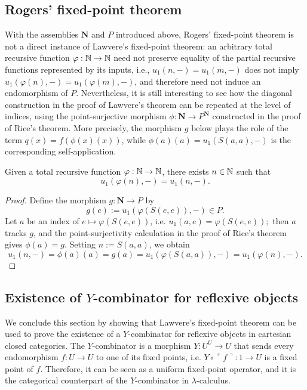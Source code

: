 \subsection*{Rogers' fixed-point theorem}
With the assemblies $\mathbf N$ and $P$ introduced above, Rogers' fixed-point theorem is not a direct instance of Lawvere's fixed-point theorem:
an arbitrary total recursive function $\varphi:\mathbb{N}\to\mathbb{N}$ need not preserve equality of the partial recursive functions represented by its inputs, i.e., $u_1(n,-) = u_1(m,-)$ does not imply $u_1(\varphi(n),-) = u_1(\varphi(m),-)$, and therefore need not induce an endomorphism of $P$.\newline
Nevertheless, it is still interesting to see how the diagonal construction in the proof of Lawvere's theorem can be repeated at the level of indices, using the point-surjective morphism $\phi:\mathbf N\to P^{\mathbf N}$ constructed in the proof of Rice's theorem.
More precisely, the morphism $g$ below plays the role of the term $q(x)=f(\phi(x)(x))$, while $\phi(a)(a)=u_1(S(a,a),-)$ is the corresponding self-application.

\begin{theorem}
    Given a total recursive function $\varphi : \mathbb{N} \to \mathbb{N}$, there exists $n \in \mathbb{N}$ such that
    \[ u_1(\varphi(n),-) = u_1(n,-). \]
\end{theorem}

\begin{proof}
    Define the morphism $g : \mathbf N \to P$ by
    \[ g(e) := u_1(\varphi(S(e,e)),-) \in P. \]
    Let $a$ be an index of $e \mapsto \varphi(S(e,e))$, i.e. $u_1(a,e) = \varphi(S(e,e));$ then $a$ tracks $g$, and the point-surjectivity calculation in the proof of Rice's theorem gives $\phi(a)=g$.
    Setting $n:=S(a,a)$, we obtain
    \[ u_1(n,-) = \phi(a)(a) = g(a) = u_1(\varphi(S(a,a)),-) = u_1(\varphi(n),-). \]
\end{proof}

\subsection*{Existence of $Y$-combinator for reflexive objects}\label{idx:y-combinator}
We conclude this section by showing that Lawvere's fixed-point theorem can be used to prove the existence of a $Y$-combinator for reflexive objects in cartesian closed categories.
The $Y$-combinator is a morphism $Y : U^U \to U$ that sends every endomorphism $f : U \to U$ to one of its fixed points, i.e. $Y \circ \ulcorner f \urcorner : 1 \to U$ is a fixed point of $f$.
Therefore, it can be seen as a uniform fixed-point operator, and it is the categorical counterpart of the $Y$-combinator in $\lambda$-calculus.


